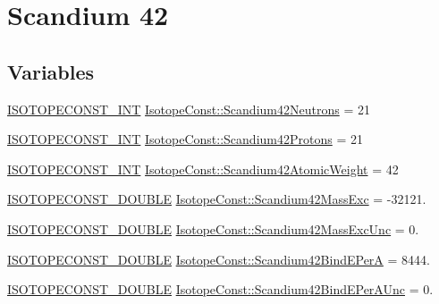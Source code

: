 \hypertarget{group___isotope_const-_scandium-_sc42}{}\section{Scandium 42}
\label{group___isotope_const-_scandium-_sc42}
\subsection*{Variables}
\begin{DoxyCompactItemize}
\item 
\mbox{\hyperlink{group___isotope_const-_macros_ga5f18360b3e99483a35c32d789e62621c}{I\+S\+O\+T\+O\+P\+E\+C\+O\+N\+S\+T\+\_\+\+I\+NT}} \mbox{\hyperlink{group___isotope_const-_scandium-_sc42_ga6956977b8469390340ff1355e539602b}{Isotope\+Const\+::\+Scandium42\+Neutrons}} = 21
\item 
\mbox{\hyperlink{group___isotope_const-_macros_ga5f18360b3e99483a35c32d789e62621c}{I\+S\+O\+T\+O\+P\+E\+C\+O\+N\+S\+T\+\_\+\+I\+NT}} \mbox{\hyperlink{group___isotope_const-_scandium-_sc42_gab815aa4d78499d8790bb54d6227cc0d5}{Isotope\+Const\+::\+Scandium42\+Protons}} = 21
\item 
\mbox{\hyperlink{group___isotope_const-_macros_ga5f18360b3e99483a35c32d789e62621c}{I\+S\+O\+T\+O\+P\+E\+C\+O\+N\+S\+T\+\_\+\+I\+NT}} \mbox{\hyperlink{group___isotope_const-_scandium-_sc42_ga31c4b24bfc52c217be1cd32d54504146}{Isotope\+Const\+::\+Scandium42\+Atomic\+Weight}} = 42
\item 
\mbox{\hyperlink{group___isotope_const-_macros_ga8f45a7272ce02c0b4c65c44636ed719a}{I\+S\+O\+T\+O\+P\+E\+C\+O\+N\+S\+T\+\_\+\+D\+O\+U\+B\+LE}} \mbox{\hyperlink{group___isotope_const-_scandium-_sc42_ga597a39a84e847e71cafe8c450ad7d847}{Isotope\+Const\+::\+Scandium42\+Mass\+Exc}} = -\/32121.
\item 
\mbox{\hyperlink{group___isotope_const-_macros_ga8f45a7272ce02c0b4c65c44636ed719a}{I\+S\+O\+T\+O\+P\+E\+C\+O\+N\+S\+T\+\_\+\+D\+O\+U\+B\+LE}} \mbox{\hyperlink{group___isotope_const-_scandium-_sc42_gafac4ff3df19ee57a79c1db773e4eda14}{Isotope\+Const\+::\+Scandium42\+Mass\+Exc\+Unc}} = 0.
\item 
\mbox{\hyperlink{group___isotope_const-_macros_ga8f45a7272ce02c0b4c65c44636ed719a}{I\+S\+O\+T\+O\+P\+E\+C\+O\+N\+S\+T\+\_\+\+D\+O\+U\+B\+LE}} \mbox{\hyperlink{group___isotope_const-_scandium-_sc42_gaddfd5001c75eff5954fad109b294e7f6}{Isotope\+Const\+::\+Scandium42\+Bind\+E\+PerA}} = 8444.
\item 
\mbox{\hyperlink{group___isotope_const-_macros_ga8f45a7272ce02c0b4c65c44636ed719a}{I\+S\+O\+T\+O\+P\+E\+C\+O\+N\+S\+T\+\_\+\+D\+O\+U\+B\+LE}} \mbox{\hyperlink{group___isotope_const-_scandium-_sc42_gafec544047db4bbb6928e49310ac0635b}{Isotope\+Const\+::\+Scandium42\+Bind\+E\+Per\+A\+Unc}} = 0.

\end{DoxyCompactItemize}
